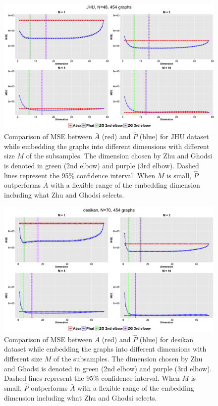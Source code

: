 \begin{figure}[!htb]
\centering
\includegraphics[width=14cm]{JHU.png}
\caption{Comparison of MSE between $\bar{A}$ (red) and $\hat{P}$ (blue) for JHU dataset while embedding the graphs into different dimensions with different size $M$ of the subsamples. The dimension chosen by Zhu and Ghodsi is denoted in green (2nd elbow) and purple (3rd elbow). Dashed lines represent the 95\% confidence interval. When $M$ is small, $\hat{P}$ outperforms $\bar{A}$ with a flexible range of the embedding dimension including what Zhu and Ghodsi selects.}
\label{fig:JHU}
\end{figure}

\begin{figure}[!htb]
\centering
\includegraphics[width=14cm]{desikan.png}
\caption{Comparison of MSE between $\bar{A}$ (red) and $\hat{P}$ (blue) for desikan dataset while embedding the graphs into different dimensions with different size $M$ of the subsamples. The dimension chosen by Zhu and Ghodsi is denoted in green (2nd elbow) and purple (3rd elbow). Dashed lines represent the 95\% confidence interval.  When $M$ is small, $\hat{P}$ outperforms $\bar{A}$ with a flexible range of the embedding dimension including what Zhu and Ghodsi selects.}
\label{fig:desikan}
\end{figure}

